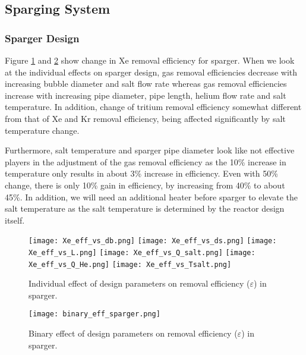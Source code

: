 \subsection{Sparging System}

\subsubsection{Sparger Design}

    Figure \ref{fig:individual_eff_sparger} and \ref{fig:binary_eff_sparger}
    show change in Xe removal efficiency for sparger. When we look at the individual effects on sparger design, gas removal efficiencies decrease with increasing bubble diameter and salt flow rate whereas gas removal efficiencies increase with increasing pipe diameter, pipe length, helium flow rate and salt temperature. In addition, change of tritium removal efficiency somewhat different from that of Xe and Kr removal efficiency, being affected significantly by salt temperature change.

    Furthermore, salt temperature and sparger pipe diameter look like not
    effective players in the adjustment of the gas removal efficiency as the
    10\% increase in temperature only results in about 3\% increase in
    efficiency. Even with 50\% change, there is only 10\% gain in efficiency, by
    increasing from 40\% to about 45\%. In addition, we will need an additional
    heater before sparger to elevate the salt temperature as the salt
    temperature is determined by the reactor design itself.

    \begin{figure}[htbp!]
        \begin{center}
            \texttt{[image: Xe\_eff\_vs\_db.png]}
            \texttt{[image: Xe\_eff\_vs\_ds.png]}
            \texttt{[image: Xe\_eff\_vs\_L.png]}
            \texttt{[image: Xe\_eff\_vs\_Q\_salt.png]}
            \texttt{[image: Xe\_eff\_vs\_Q\_He.png]}
            \texttt{[image: Xe\_eff\_vs\_Tsalt.png]}
        \end{center}
        \caption{Individual effect of design parameters on removal
            efficiency
            ($\varepsilon$) in sparger.}
        \label{fig:individual_eff_sparger}
    \end{figure}

    \begin{figure}[htbp!]
        \begin{center}
            \texttt{[image: binary\_eff\_sparger.png]}
        \end{center}
        \caption{Binary effect of design parameters on removal
            efficiency
            ($\varepsilon$) in sparger.}
        \label{fig:binary_eff_sparger}
    \end{figure}


